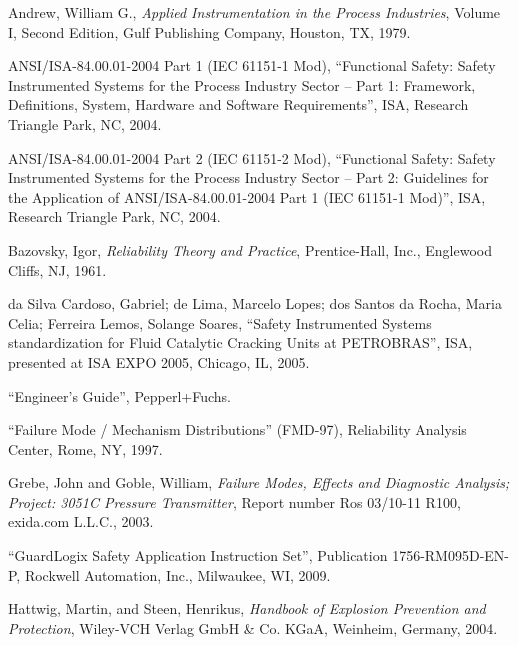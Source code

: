 \vskip 10pt

\noindent
Andrew, William G., \textit{Applied Instrumentation in the Process Industries}, Volume I, Second Edition, Gulf Publishing Company, Houston, TX, 1979.

\vskip 10pt

\noindent
ANSI/ISA-84.00.01-2004 Part 1 (IEC 61151-1 Mod), ``Functional Safety: Safety Instrumented Systems for the Process Industry Sector -- Part 1: Framework, Definitions, System, Hardware and Software Requirements'', ISA, Research Triangle Park, NC, 2004.

\vskip 10pt

\noindent
ANSI/ISA-84.00.01-2004 Part 2 (IEC 61151-2 Mod), ``Functional Safety: Safety Instrumented Systems for the Process Industry Sector -- Part 2: Guidelines for the Application of ANSI/ISA-84.00.01-2004 Part 1 (IEC 61151-1 Mod)'', ISA, Research Triangle Park, NC, 2004.

\vskip 10pt

\noindent
Bazovsky, Igor, \textit{Reliability Theory and Practice}, Prentice-Hall, Inc., Englewood Cliffs, NJ, 1961.

\vskip 10pt

\noindent
da Silva Cardoso, Gabriel; de Lima, Marcelo Lopes; dos Santos da Rocha, Maria Celia; Ferreira Lemos, Solange Soares, ``Safety Instrumented Systems standardization for Fluid Catalytic Cracking Units at PETROBRAS'', ISA, presented at ISA EXPO 2005, Chicago, IL, 2005.

\vskip 10pt

\noindent
``Engineer's Guide'', Pepperl+Fuchs.

\vskip 10pt

\noindent
``Failure Mode / Mechanism Distributions'' (FMD-97), Reliability Analysis Center, Rome, NY, 1997.

\vskip 10pt

\noindent
Grebe, John and Goble, William, \textit{Failure Modes, Effects and Diagnostic Analysis; Project: 3051C Pressure Transmitter}, Report number Ros 03/10-11 R100, exida.com L.L.C., 2003.

\vskip 10pt

\noindent
``GuardLogix Safety Application Instruction Set'', Publication 1756-RM095D-EN-P, Rockwell Automation, Inc., Milwaukee, WI, 2009.

\vskip 10pt

\noindent
Hattwig, Martin, and Steen, Henrikus, \textit{Handbook of Explosion Prevention and Protection}, Wiley-VCH Verlag GmbH \& Co. KGaA, Weinheim, Germany, 2004.

